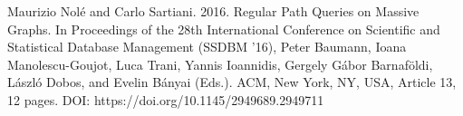 \documentclass[12pt]{article}  %
\theoremstyle{definition}
\theoremstyle{remark}
\begin{document}
\begin{thebibliography}{9}



Maurizio Nolé and Carlo Sartiani. 2016. Regular Path Queries on Massive Graphs. In Proceedings of the 28th International Conference on Scientific and Statistical Database Management (SSDBM '16), Peter Baumann, Ioana Manolescu-Goujot, Luca Trani, Yannis Ioannidis, Gergely Gábor Barnaföldi, László Dobos, and Evelin Bányai (Eds.). ACM, New York, NY, USA, Article 13, 12 pages. DOI: https://doi.org/10.1145/2949689.2949711



\end{thebibliography}
\end{document}
